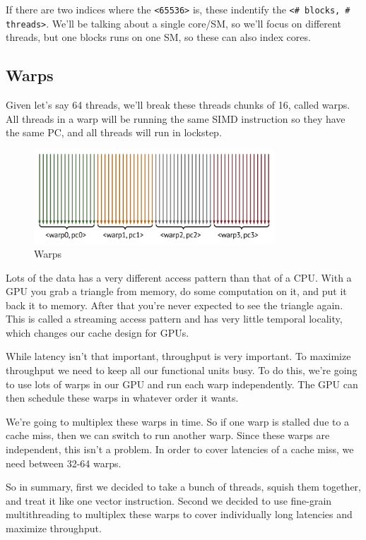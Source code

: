 \documentclass{article}
\begin{document}
If there are two indices where the \texttt{<65536>} is, these indentify the \texttt{<\# blocks, \# threads>}. We'll be talking about a single core/SM, so we'll focus on different threads, but one blocks runs on one SM, so these can also index cores.

\subsection{Warps}

Given let's say 64 threads, we'll break these threads chunks of 16, called warps. All threads in a warp will be running the same SIMD instruction so they have the same PC, and all threads will run in lockstep.

 \begin{figure}[ht!]
\centering
\includegraphics[width=90mm]{img/warps.png}
\caption{Warps}
\end{figure}

Lots of the data has a very different access pattern than that of a CPU. With a GPU you grab a triangle from memory, do some computation on it, and put it back it to memory. After that you're never expected to see the triangle again. This is called a streaming access pattern and has very little temporal locality, which changes our cache design for GPUs.


While latency isn't that important, throughput is very important. To maximize throughput we need to keep all our functional units busy. To do this, we're going to use lots of warps in our GPU and run each warp independently. The GPU can then schedule these warps in whatever order it wants. 

We're going to multiplex these warps in time. So if one warp is stalled due to a cache miss, then we can switch to run another warp. Since these warps are independent, this isn't a problem. In order to cover latencies of a cache miss, we need between 32-64 warps. 

So in summary, first we decided to take a bunch of threads, squish them together, and treat it like one vector instruction. Second we decided to use fine-grain multithreading to multiplex these warps to cover individually long latencies and maximize throughput. 
\end{document}
